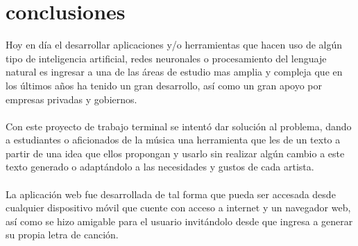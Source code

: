 \section{conclusiones}
Hoy en día el desarrollar aplicaciones y/o herramientas que hacen uso de algún tipo
de inteligencia artificial, redes neuronales o procesamiento del lenguaje natural es
ingresar a una de las áreas de estudio mas amplia y compleja que en los últimos años
ha tenido un gran desarrollo, así como un gran apoyo por empresas privadas y gobiernos.\\\\
Con este proyecto de trabajo terminal se intentó dar solución al problema, dando a
estudiantes o aficionados de la música una herramienta que les de un texto a partir
de una idea que ellos propongan y usarlo sin realizar algún cambio a este texto generado
o adaptándolo a las necesidades y gustos de cada artista.\\\\
La aplicación web fue desarrollada de tal forma que pueda ser accesada desde cualquier
dispositivo móvil que cuente con acceso a internet y un navegador web, así como se hizo
amigable para el usuario invitándolo desde que ingresa a generar su propia letra de canción. 
